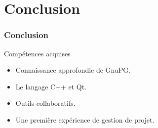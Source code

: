 \section{Conclusion}
\begin{frame}
  \frametitle{\color{white}Conclusion}
  \begin{block}{Compétences acquises}
      \begin{itemize}
        \item Connaissance approfondie de GnuPG.
        \item Le langage C++ et Qt.
        \item Outils collaboratifs.
        \item Une première expérience de gestion de projet.
      \end{itemize}
    \end{block}
\end{frame}
        
